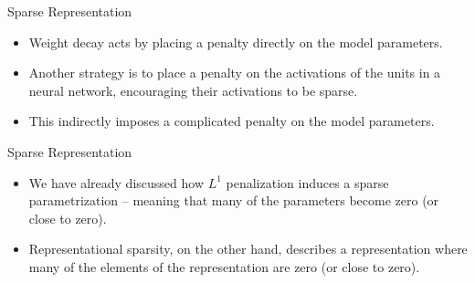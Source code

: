\documentclass[10pt]{beamer}
\begin{document}
	\begin{frame}{Sparse Representation}
		\begin{itemize}
			\pause
			\item Weight decay acts by placing a penalty directly on the model parameters.
			\pause
			\item Another strategy is to place a penalty on the activations of the units in a neural network, encouraging their activations to be sparse.
			\pause
			\item This indirectly imposes a complicated penalty on the model parameters.
		\end{itemize}
	\end{frame}
	
	\begin{frame}{Sparse Representation}
		\begin{itemize}
			\item We have already discussed how $L^1$ penalization induces a sparse parametrization -- meaning that many of the parameters become zero (or close to zero).
			\pause
			\item Representational sparsity, on the other hand, describes a representation where many of the elements of the representation are zero (or close to zero).
		\end{itemize}
	\end{frame}
	
\end{document}
